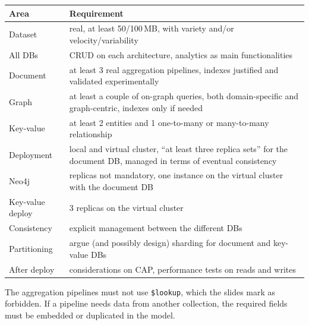 \begin{center}\small
\begin{tabular}{p{3cm}p{10.7cm}}
\toprule
\textbf{Area} & \textbf{Requirement} \\
\midrule
Dataset & real, at least 50/100\,MB, with variety and/or velocity/variability \\
All DBs & CRUD on each architecture, analytics as main functionalities \\
Document & at least 3 real aggregation pipelines, indexes justified and validated experimentally \\
Graph & at least a couple of on-graph queries, both domain-specific and graph-centric, indexes only if needed \\
Key-value & at least 2 entities and 1 one-to-many or many-to-many relationship \\
Deployment & local and virtual cluster, ``at least three replica sets'' for the document DB, managed in terms of eventual consistency \\
Neo4j & replicas not mandatory, one instance on the virtual cluster with the document DB \\
Key-value deploy & 3 replicas on the virtual cluster \\
Consistency & explicit management between the different DBs \\
Partitioning & argue (and possibly design) sharding for document and key-value DBs \\
After deploy & considerations on CAP, performance tests on reads and writes \\
\bottomrule
\end{tabular}
\end{center}

\begin{remark}
The aggregation pipelines must not use \texttt{\$lookup}, which the slides mark as forbidden. If a pipeline needs data from another collection, the required fields must be embedded or duplicated in the model.
\end{remark}

